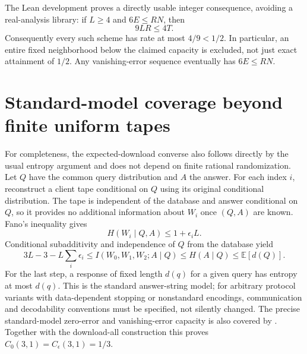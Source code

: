 \documentclass[11pt]{article}
\begin{document}
The Lean development proves a directly usable integer consequence, avoiding a real-analysis library: if $L\ge4$ and $6E\le RN$, then
\[
 9LR\le4T.
\]
Consequently every such scheme has rate at most $4/9<1/2$. In particular, an entire fixed neighborhood below the claimed capacity is excluded, not just exact attainment of $1/2$. Any vanishing-error sequence eventually has $6E\le RN$.

\section{Standard-model coverage beyond finite uniform tapes}
For completeness, the expected-download converse also follows directly by the usual entropy argument and does not depend on finite rational randomization. Let $Q$ have the common query distribution and $A$ the answer. For each index $i$, reconstruct a client tape conditional on $Q$ using its original conditional distribution. The tape is independent of the database and answer conditional on $Q$, so it provides no additional information about $W_i$ once $(Q,A)$ are known. Fano's inequality gives
\[
 H(W_i\mid Q,A)\le1+\epsilon_i L.
\]
Conditional subadditivity and independence of $Q$ from the database yield
\[
 3L-3-L\sum_i\epsilon_i\le I(W_0,W_1,W_2;A\mid Q)
 \le H(A\mid Q)\le\mathbb E[d(Q)].
\]
For the last step, a response of fixed length $d(q)$ for a given query has entropy at most $d(q)$. This is the standard answer-string model; for arbitrary protocol variants with data-dependent stopping or nonstandard encodings, communication and decodability conventions must be specified, not silently changed. The precise standard-model zero-error and vanishing-error capacity is also covered by \cite[Sections II--III and V]{sun}. Together with the download-all construction this proves $C_0(3,1)=C_\epsilon(3,1)=1/3$.
\end{document}
